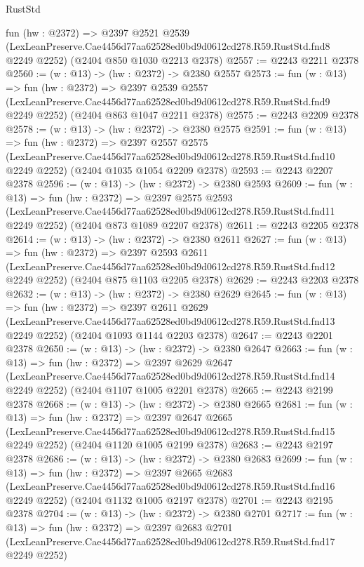 \begin{lexlean}{RustStd}
\begin{coremodule}
  fun (hw : @2372) =>
  @2397
    @2521
    @2539
    (LexLeanPreserve.Cae4456d77aa62528ed0bd9d0612cd278.R59.RustStd.fnd8 @2249 @2252)
    (@2404 @850 @1030 @2213 @2378)
@2557 := @2243 @2211 @2378
@2560 := (w : @13) -> (hw : @2372) -> @2380 @2557
@2573 := fun (w : @13) =>
  fun (hw : @2372) =>
  @2397
    @2539
    @2557
    (LexLeanPreserve.Cae4456d77aa62528ed0bd9d0612cd278.R59.RustStd.fnd9 @2249 @2252)
    (@2404 @863 @1047 @2211 @2378)
@2575 := @2243 @2209 @2378
@2578 := (w : @13) -> (hw : @2372) -> @2380 @2575
@2591 := fun (w : @13) =>
  fun (hw : @2372) =>
  @2397
    @2557
    @2575
    (LexLeanPreserve.Cae4456d77aa62528ed0bd9d0612cd278.R59.RustStd.fnd10 @2249 @2252)
    (@2404 @1035 @1054 @2209 @2378)
@2593 := @2243 @2207 @2378
@2596 := (w : @13) -> (hw : @2372) -> @2380 @2593
@2609 := fun (w : @13) =>
  fun (hw : @2372) =>
  @2397
    @2575
    @2593
    (LexLeanPreserve.Cae4456d77aa62528ed0bd9d0612cd278.R59.RustStd.fnd11 @2249 @2252)
    (@2404 @873 @1089 @2207 @2378)
@2611 := @2243 @2205 @2378
@2614 := (w : @13) -> (hw : @2372) -> @2380 @2611
@2627 := fun (w : @13) =>
  fun (hw : @2372) =>
  @2397
    @2593
    @2611
    (LexLeanPreserve.Cae4456d77aa62528ed0bd9d0612cd278.R59.RustStd.fnd12 @2249 @2252)
    (@2404 @875 @1103 @2205 @2378)
@2629 := @2243 @2203 @2378
@2632 := (w : @13) -> (hw : @2372) -> @2380 @2629
@2645 := fun (w : @13) =>
  fun (hw : @2372) =>
  @2397
    @2611
    @2629
    (LexLeanPreserve.Cae4456d77aa62528ed0bd9d0612cd278.R59.RustStd.fnd13 @2249 @2252)
    (@2404 @1093 @1144 @2203 @2378)
@2647 := @2243 @2201 @2378
@2650 := (w : @13) -> (hw : @2372) -> @2380 @2647
@2663 := fun (w : @13) =>
  fun (hw : @2372) =>
  @2397
    @2629
    @2647
    (LexLeanPreserve.Cae4456d77aa62528ed0bd9d0612cd278.R59.RustStd.fnd14 @2249 @2252)
    (@2404 @1107 @1005 @2201 @2378)
@2665 := @2243 @2199 @2378
@2668 := (w : @13) -> (hw : @2372) -> @2380 @2665
@2681 := fun (w : @13) =>
  fun (hw : @2372) =>
  @2397
    @2647
    @2665
    (LexLeanPreserve.Cae4456d77aa62528ed0bd9d0612cd278.R59.RustStd.fnd15 @2249 @2252)
    (@2404 @1120 @1005 @2199 @2378)
@2683 := @2243 @2197 @2378
@2686 := (w : @13) -> (hw : @2372) -> @2380 @2683
@2699 := fun (w : @13) =>
  fun (hw : @2372) =>
  @2397
    @2665
    @2683
    (LexLeanPreserve.Cae4456d77aa62528ed0bd9d0612cd278.R59.RustStd.fnd16 @2249 @2252)
    (@2404 @1132 @1005 @2197 @2378)
@2701 := @2243 @2195 @2378
@2704 := (w : @13) -> (hw : @2372) -> @2380 @2701
@2717 := fun (w : @13) =>
  fun (hw : @2372) =>
  @2397
    @2683
    @2701
    (LexLeanPreserve.Cae4456d77aa62528ed0bd9d0612cd278.R59.RustStd.fnd17 @2249 @2252)

\end{coremodule}
\end{lexlean}

